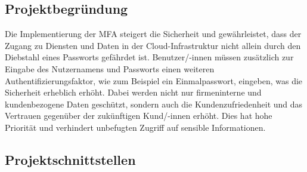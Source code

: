 \subsection{Projektbegründung} 
\label{sec:Projektbegruendung}
Die Implementierung der \acs{MFA} steigert die Sicherheit und gewährleistet, dass der Zugang zu Diensten und Daten in der 
Cloud-Infrastruktur nicht allein durch den Diebstahl eines Passworts gefährdet ist. Benutzer/-innen müssen zusätzlich zur Eingabe des 
Nutzernamens und Passworts einen weiteren Authentifizierungsfaktor, wie zum Beispiel ein Einmalpasswort, eingeben, 
was die Sicherheit erheblich erhöht. Dabei werden nicht nur firmeninterne und kundenbezogene Daten geschützt, sondern auch 
die Kundenzufriedenheit und das Vertrauen gegenüber der zukünftigen Kund/-innen erhöht. Dies hat hohe Priorität und verhindert 
unbefugten Zugriff auf sensible Informationen.


\subsection{Projektschnittstellen} 
\label{sec:Projektschnittstellen}


